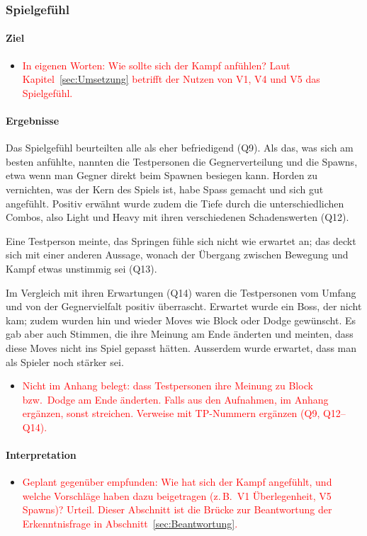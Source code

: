 \documentclass[../Main.tex]{subfiles}
\begin{document}
\subsubsection{Spielgefühl}

\paragraph{Ziel}
\begin{itemize}[leftmargin=1.5cm]
    \item \textcolor{red}{In eigenen Worten: Wie sollte sich der Kampf anfühlen? Laut Kapitel~\ref{sec:Umsetzung} betrifft der Nutzen von V1, V4 und V5 das Spielgefühl.}
\end{itemize}

\paragraph{Ergebnisse}
Das Spielgefühl beurteilten alle als eher befriedigend (Q9). Als das, was sich am besten anfühlte, nannten die Testpersonen die Gegnerverteilung und die Spawns, etwa wenn man Gegner direkt beim Spawnen besiegen kann. Horden zu vernichten, was der Kern des Spiels ist, habe Spass gemacht und sich gut angefühlt. Positiv erwähnt wurde zudem die Tiefe durch die unterschiedlichen Combos, also Light und Heavy mit ihren verschiedenen Schadenswerten (Q12).

Eine Testperson meinte, das Springen fühle sich nicht wie erwartet an; das deckt sich mit einer anderen Aussage, wonach der Übergang zwischen Bewegung und Kampf etwas unstimmig sei (Q13).

Im Vergleich mit ihren Erwartungen (Q14) waren die Testpersonen vom Umfang und von der Gegnervielfalt positiv überrascht. Erwartet wurde ein Boss, der nicht kam; zudem wurden hin und wieder Moves wie Block oder Dodge gewünscht. Es gab aber auch Stimmen, die ihre Meinung am Ende änderten und meinten, dass diese Moves nicht ins Spiel gepasst hätten. Ausserdem wurde erwartet, dass man als Spieler noch stärker sei.

\begin{itemize}[leftmargin=1.5cm]
    \item \textcolor{red}{Nicht im Anhang belegt: dass Testpersonen ihre Meinung zu Block bzw.\ Dodge am Ende änderten. Falls aus den Aufnahmen, im Anhang ergänzen, sonst streichen. Verweise mit TP-Nummern ergänzen (Q9, Q12--Q14).}
\end{itemize}

\paragraph{Interpretation}
\begin{itemize}[leftmargin=1.5cm]
    \item \textcolor{red}{Geplant gegenüber empfunden: Wie hat sich der Kampf angefühlt, und welche Vorschläge haben dazu beigetragen (z.\,B.\ V1 Überlegenheit, V5 Spawns)? Urteil. Dieser Abschnitt ist die Brücke zur Beantwortung der Erkenntnisfrage in Abschnitt~\ref{sec:Beantwortung}.}
\end{itemize}
\end{document}
